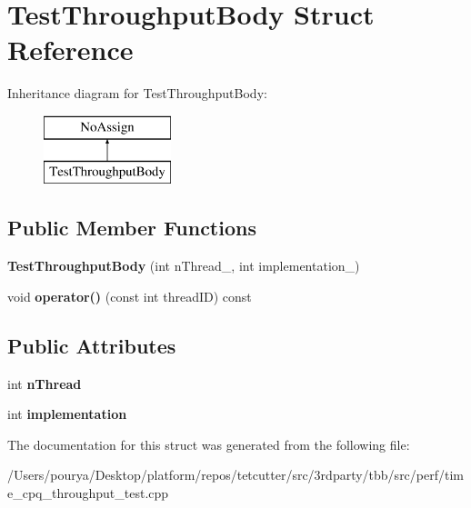 \hypertarget{structTestThroughputBody}{}\section{Test\+Throughput\+Body Struct Reference}
\label{structTestThroughputBody}
Inheritance diagram for Test\+Throughput\+Body\+:\begin{figure}[H]
\begin{center}
\leavevmode
\includegraphics[height=2.000000cm]{structTestThroughputBody}
\end{center}
\end{figure}
\subsection*{Public Member Functions}
\begin{DoxyCompactItemize}
\item 
\hypertarget{structTestThroughputBody_a4a679f506f4d9a76d98f46daaf6c1c3f}{}{\bfseries Test\+Throughput\+Body} (int n\+Thread\+\_\+, int implementation\+\_\+)\label{structTestThroughputBody_a4a679f506f4d9a76d98f46daaf6c1c3f}

\item 
\hypertarget{structTestThroughputBody_ae3bfffc5c572644ba1ce1ba1969b2f34}{}void {\bfseries operator()} (const int thread\+I\+D) const \label{structTestThroughputBody_ae3bfffc5c572644ba1ce1ba1969b2f34}

\end{DoxyCompactItemize}
\subsection*{Public Attributes}
\begin{DoxyCompactItemize}
\item 
\hypertarget{structTestThroughputBody_a9fba5b5a49e5780c7314d73ded1a80a5}{}int {\bfseries n\+Thread}\label{structTestThroughputBody_a9fba5b5a49e5780c7314d73ded1a80a5}

\item 
\hypertarget{structTestThroughputBody_aa33b00a7522a6c5b150e58cb62816ac2}{}int {\bfseries implementation}\label{structTestThroughputBody_aa33b00a7522a6c5b150e58cb62816ac2}

\end{DoxyCompactItemize}


The documentation for this struct was generated from the following file\+:\begin{DoxyCompactItemize}
\item 
/\+Users/pourya/\+Desktop/platform/repos/tetcutter/src/3rdparty/tbb/src/perf/time\+\_\+cpq\+\_\+throughput\+\_\+test.\+cpp\end{DoxyCompactItemize}
